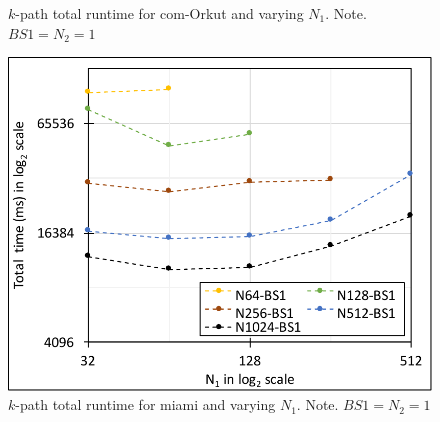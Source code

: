 \begin{figure}[!htb]
\begin{minipage}{0.32\textwidth}
        \caption{$k$-path total runtime for com-Orkut and varying $N_1$. Note. $BS1=N_2=1$}
        \label{fig:fig-perf-kpath-orkut-k6-bs1.pdf}
    \end{minipage}  
    \hspace{0mm}
    \begin{minipage}{0.33\textwidth}
        \centering
        \includegraphics[width=1\columnwidth]{img/kpath-N1N/fig-perf-kpath-miami-k6-bs1.pdf}
        \caption{$k$-path total runtime for miami and varying $N_1$. Note. $BS1=N_2=1$}
        \label{fig:fig-perf-kpath-miami-k6-bs1.pdf}
    \end{minipage}  
\end{figure}

